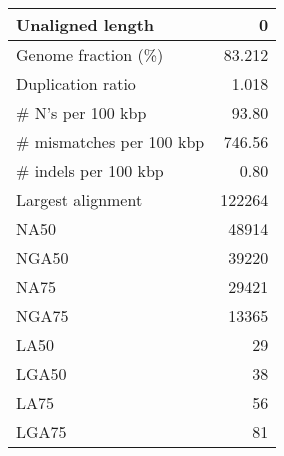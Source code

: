 \documentclass[12pt,a4paper]{article}
\begin{document}
\begin{table}[ht]
\begin{center}
\begin{tabular}{|l*{1}{|r}|}
Unaligned length & 0 \\ \hline
Genome fraction (\%) & 83.212 \\ \hline
Duplication ratio & 1.018 \\ \hline
\# N's per 100 kbp & 93.80 \\ \hline
\# mismatches per 100 kbp & 746.56 \\ \hline
\# indels per 100 kbp & 0.80 \\ \hline
Largest alignment & 122264 \\ \hline
NA50 & 48914 \\ \hline
NGA50 & 39220 \\ \hline
NA75 & 29421 \\ \hline
NGA75 & 13365 \\ \hline
LA50 & 29 \\ \hline
LGA50 & 38 \\ \hline
LA75 & 56 \\ \hline
LGA75 & 81 \\ \hline
\end{tabular}
\end{center}
\end{table}
\end{document}
